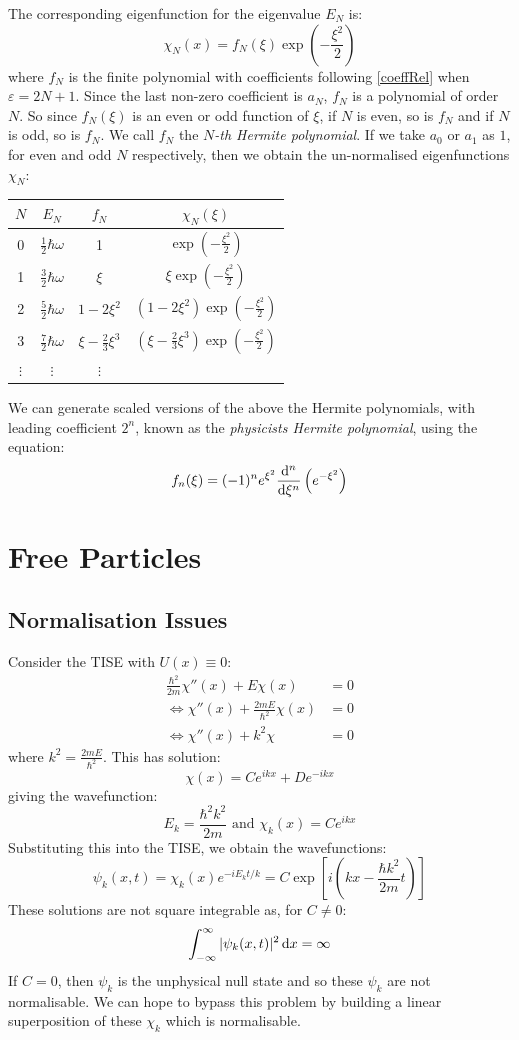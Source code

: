 \documentclass[../main.tex]{subfiles}
\begin{document}
The corresponding eigenfunction for the eigenvalue $E_N$ is:
\[
  \chi_N(x) = f_N(\xi) \exp\left(-\frac{\xi^2}{2}\right)
\]
where $f_N$ is the finite polynomial with coefficients following \cref{coeffRel} when $\varepsilon = 2N + 1$.
Since the last non-zero coefficient is $a_N$, $f_N$ is a polynomial of order $N$.
So since $f_N(\xi)$ is an even or odd function of $\xi$, if $N$ is even, so is $f_N$ and if $N$ is odd, so is $f_N$.
We call $f_N$ the \textit{$N$-th Hermite polynomial}.
If we take $a_0$ or $a_1$ as $1$, for even and odd $N$ respectively, then we obtain the un-normalised eigenfunctions $\chi_N$:
\begin{center}
\begin{tabular}{c|c|c|c}
  $N$ & $E_N$ & $f_N$ & $\chi_N(\xi)$ \\
\hline
0 & $\frac{1}{2} \hbar \omega$ & 1 &  $\exp\left(-\frac{\xi^2}{2}\right)$ \\
1 & $\frac{3}{2} \hbar \omega$ & $\xi$ &$\xi \exp\left(-\frac{\xi^2}{2}\right)$ \\
2 & $\frac{5}{2} \hbar \omega$ & $1 - 2\xi^2$ &$(1 - 2\xi^2)\exp\left(-\frac{\xi^2}{2}\right)$ \\
3 & $\frac{7}{2} \hbar \omega$ & $\xi - \frac{2}{3} \xi^3$ & $(\xi - \frac{2}{3} \xi^3) \exp\left(-\frac{\xi^2}{2}\right)$ \\
$\vdots$ & $\vdots$ & $\vdots$ \\
\end{tabular}
\end{center}
We can generate scaled versions of the above the Hermite polynomials, with leading coefficient $2^{n}$, known as the \textit{physicists Hermite polynomial}, using the equation:
\begin{equation}
  f_n(\xi) = (-1)^{n} e^{\xi^2} \deriv[n]{}{\xi}\left(e^{-\xi^2}\right) \label{hermGen}
\end{equation}
\section{Free Particles}
\subsection{Normalisation Issues} \label{normIssSec}
Consider the TISE with $U(x) \equiv 0$:
\begin{align*}
  \frac{\hbar^2}{2 m} \chi''(x) + E\chi(x) &= 0 \\
  \iff \chi''(x) + \frac{2mE}{\hbar^2} \chi(x) &= 0 \\
  \iff \chi''(x) + k^2 \chi &= 0
\end{align*}
where $k^2 = \frac{2mE}{\hbar^2}$.
This has solution:
\[
  \chi(x) = Ce^{ikx} + De^{-ikx}
\]
giving the wavefunction:
\[
  E_k = \frac{\hbar^2 k^2}{2m} \text{ and } \chi_k(x) = Ce^{ikx}
\]
Substituting this into the TISE, we obtain the wavefunctions:
\[
  \psi_k(x, t) = \chi_k(x) e^{-i E_k t/k} = C \exp\left[i\left(kx - \frac{\hbar k^2}{2m}t\right)\right]
\]
These solutions are not square integrable as, for $C \neq 0$:
\[
  \int_{-\infty}^{\infty} |\psi_k(x, t)|^2 \d{x} = \infty
\]
If $C = 0$, then $\psi_k$ is the unphysical null state and so these $\psi_k$ are not normalisable.
We can hope to bypass this problem by building a linear superposition of these $\chi_k$ which is normalisable.
\end{document}
